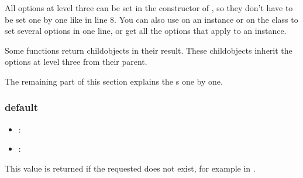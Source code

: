 \documentclass[a4paper,10pt,english]{sphinxmanual}
\begin{document}
\sphinxAtStartPar
All \sphinxhyphen{}options at level three can be set in the constructor of , so they don’t have to be set one by one like in line 8. You can also use  on an instance or on the \sphinxhyphen{}class to set several options in one line, or get all the options that apply to an instance.

\sphinxAtStartPar
Some \sphinxhyphen{}functions return child\sphinxhyphen{}\sphinxhyphen{}objects in their result. These child\sphinxhyphen{}objects inherit the options at level three from their parent.

\sphinxAtStartPar
The remaining part of this section explains the s one by one.


\subsubsection{default}
\label{\detokenize{README:default}}\begin{itemize}
\item {}
\sphinxAtStartPar
{}: 

\item {}
\sphinxAtStartPar
{}: 

\end{itemize}

\sphinxAtStartPar
This value is returned if the requested {\hyperref[\detokenize{README:the-path-parameter}]{\emph{}}} does not exist, for example in {\hyperref[\detokenize{README:the-path-parameter}]{\emph{}}}.
\end{document}
